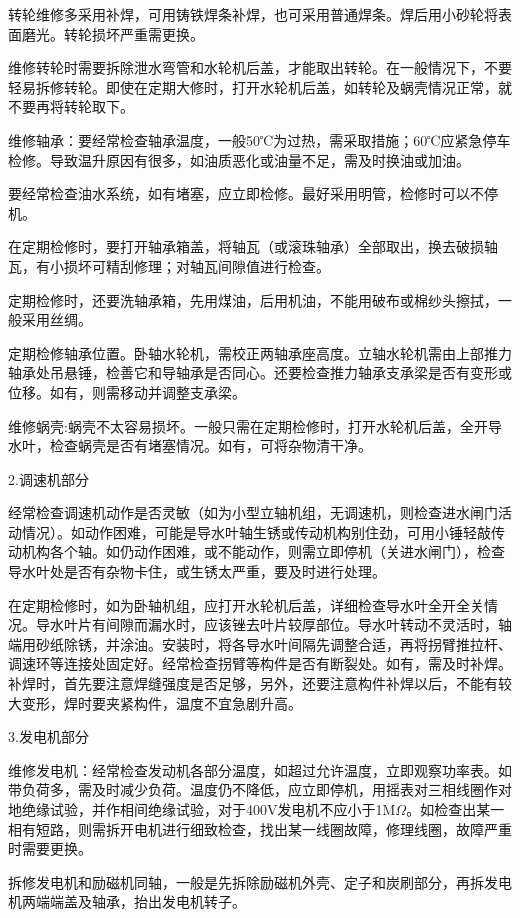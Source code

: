 \documentclass{ctexbook}
\begin{document}
转轮维修多采用补焊，可用铸铁焊条补焊，也可采用普通焊条。焊后用小砂轮将表面磨光。转轮损坏严重需更换。

维修转轮时需要拆除泄水弯管和水轮机后盖，才能取出转轮。在一般情况下，不要轻易拆修转轮。即使在定期大修时，打开水轮机后盖，如转轮及蜗壳情况正常，就不要再将转轮取下。

维修轴承：要经常检查轴承温度，一般50℃为过热，需采取措施；60℃应紧急停车检修。导致温升原因有很多，如油质恶化或油量不足，需及时换油或加油。

要经常检查油水系统，如有堵塞，应立即检修。最好采用明管，检修时可以不停机。

在定期检修时，要打开轴承箱盖，将轴瓦（或滚珠轴承）全部取出，换去破损轴瓦，有小损坏可精刮修理；对轴瓦间隙值进行检查。

定期检修时，还要洗轴承箱，先用煤油，后用机油，不能用破布或棉纱头擦拭，一般采用丝绸。

定期检修轴承位置。卧轴水轮机，需校正两轴承座高度。立轴水轮机需由上部推力轴承处吊悬锤，检善它和导轴承是否同心。还要检查推力轴承支承梁是否有变形或位移。如有，则需移动并调整支承梁。

维修蜗壳:蜗壳不太容易损坏。一般只需在定期检修时，打开水轮机后盖，全开导水叶，检查蜗壳是否有堵塞情况。如有，可将杂物清干净。

2.调速机部分

经常检查调速机动作是否灵敏（如为小型立轴机组，无调速机，则检查进水闸门活动情况）。如动作困难，可能是导水叶轴生锈或传动机构别住劲，可用小锤轻敲传动机构各个轴。如仍动作困难，或不能动作，则需立即停机（关进水闸门），检查导水叶处是否有杂物卡住，或生锈太严重，要及时进行处理。

在定期检修时，如为卧轴机组，应打开水轮机后盖，详细检查导水叶全开全关情况。导水叶片有间隙而漏水时，应该锉去叶片较厚部位。导水叶转动不灵活时，轴端用砂纸除锈，并涂油。安装时，将各导水叶间隔先调整合适，再将拐臂推拉杆、调速环等连接处固定好。经常检查拐臂等构件是否有断裂处。如有，需及时补焊。补焊时，首先要注意焊缝强度是否足够，另外，还要注意构件补焊以后，不能有较大变形，焊时要夹紧构件，温度不宜急剧升高。

3.发电机部分

维修发电机：经常检查发动机各部分温度，如超过允许温度，立即观察功率表。如带负荷多，需及时减少负荷。温度仍不降低，应立即停机，用摇表对三相线圈作对地绝缘试验，并作相间绝缘试验，对于400V发电机不应小于1M$\Omega$。如检查出某一相有短路，则需拆开电机进行细致检查，找出某一线圈故障，修理线圈，故障严重时需要更换。

拆修发电机和励磁机同轴，一般是先拆除励磁机外壳、定子和炭刷部分，再拆发电机两端端盖及轴承，抬出发电机转子。
\end{document}
